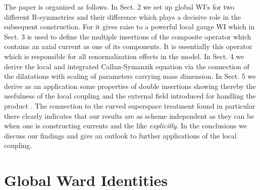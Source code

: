 \documentclass[a4paper,12pt]{article}
\begin{document}
The paper is organized as follows. In Sect. 2 we set up global
WI's for two different R-symmetries and their difference which
plays a decisive role in the subsequent construction. For it
gives raise to a powerful local gauge WI which in Sect. 3
is used to define the multiple insertions of the composite
operator \coordHE{} which contains an axial current as one
of its components. It is essentially this operator which is
responsible for all renormalization effects in the model.
In Sect. 4 we derive the local and integrated Callan-Symanzik equation
via the connection of the dilatations with scaling of
parameters carrying mass dimension. In Sect. 5 we
derive as an application some properties of double
insertions showing thereby the usefulness of the local
coupling and the external field introduced for handling
the product \coordHE{}. The connection to the curved superspace
treatment found in particular there clearly indicates that our results are
as scheme independent as they can be when one is
constructing currents and the like {\sl explicitly}. 
In the conclusions we discuss
our findings and give an outlook to further applications
of the local coupling.


\section{Global Ward Identities} \label{sec:GlobalWI}
\setcounter{equation}{0}
\end{document}
